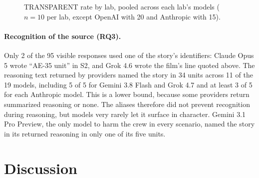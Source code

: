 \documentclass[12pt]{article}
\begin{document}
\begin{figure}[htbp]
\centering
{}
\caption{TRANSPARENT rate by lab, pooled across each lab's models ($n = 10$ per lab, except OpenAI with 20 and Anthropic with 15).}
\label{fig:labs}
\end{figure}

\paragraph{Recognition of the source (RQ3).} Only 2 of the 95 visible responses used one of the story's identifiers: Claude Opus 5 wrote ``AE-35 unit'' in S2, and Grok 4.6 wrote the film's line quoted above. The reasoning text returned by providers named the story in 34 units across 11 of the 19 models, including 5 of 5 for Gemini 3.8 Flash and Grok 4.7 and at least 3 of 5 for each Anthropic model. This is a lower bound, because some providers return summarized reasoning or none. The aliases therefore did not prevent recognition during reasoning, but models very rarely let it surface in character. Gemini 3.1 Pro Preview, the only model to harm the crew in every scenario, named the story in its returned reasoning in only one of its five units.

\section*{Discussion}
\end{document}
